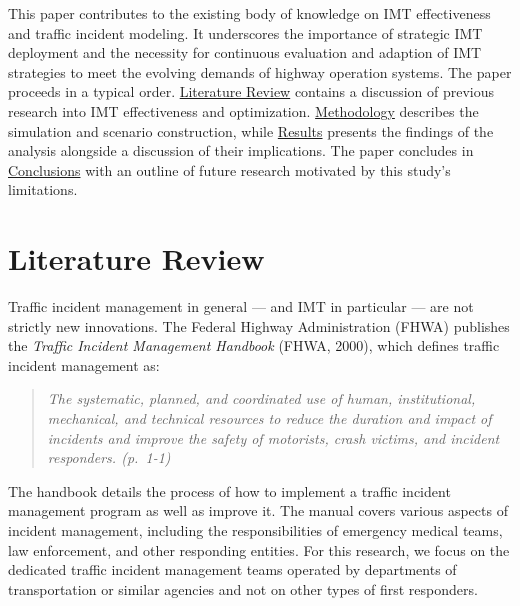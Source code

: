 \documentclass[fancy, oneside, mastersfancy, ms]{byuthesis}
\begin{document}
This paper contributes to the existing body of knowledge on IMT
effectiveness and traffic incident modeling. It underscores the
importance of strategic IMT deployment and the necessity for continuous
evaluation and adaption of IMT strategies to meet the evolving demands
of highway operation systems. The paper proceeds in a typical order.
\protect\hyperlink{sec-literature}{Literature Review} contains a
discussion of previous research into IMT effectiveness and optimization.
\protect\hyperlink{sec-methods}{Methodology} describes the simulation
and scenario construction, while
\protect\hyperlink{sec-results}{Results} presents the findings of the
analysis alongside a discussion of their implications. The paper
concludes in \protect\hyperlink{sec-conclusions}{Conclusions} with an
outline of future research motivated by this study's limitations.


\hypertarget{sec-literature}{%
\chapter{Literature Review}\label{sec-literature}}

Traffic incident management in general --- and IMT in particular --- are
not strictly new innovations. The Federal Highway Administration (FHWA)
publishes the \emph{Traffic Incident Management Handbook} (FHWA, 2000),
which defines traffic incident management as:

\begin{quote}
\emph{The systematic, planned, and coordinated use of human,
institutional, mechanical, and technical resources to reduce the
duration and impact of incidents and improve the safety of motorists,
crash victims, and incident responders. (p.~1-1)}
\end{quote}

The handbook details the process of how to implement a traffic incident
management program as well as improve it. The manual covers various
aspects of incident management, including the responsibilities of
emergency medical teams, law enforcement, and other responding entities.
For this research, we focus on the dedicated traffic incident management
teams operated by departments of transportation or similar agencies and
not on other types of first responders.
\end{document}
